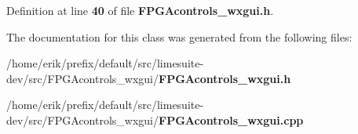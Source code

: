Definition at line {\bf 40} of file {\bf F\+P\+G\+Acontrols\+\_\+wxgui.\+h}.



The documentation for this class was generated from the following files\+:\begin{DoxyCompactItemize}
\item 
/home/erik/prefix/default/src/limesuite-\/dev/src/\+F\+P\+G\+Acontrols\+\_\+wxgui/{\bf F\+P\+G\+Acontrols\+\_\+wxgui.\+h}\item 
/home/erik/prefix/default/src/limesuite-\/dev/src/\+F\+P\+G\+Acontrols\+\_\+wxgui/{\bf F\+P\+G\+Acontrols\+\_\+wxgui.\+cpp}\end{DoxyCompactItemize}
